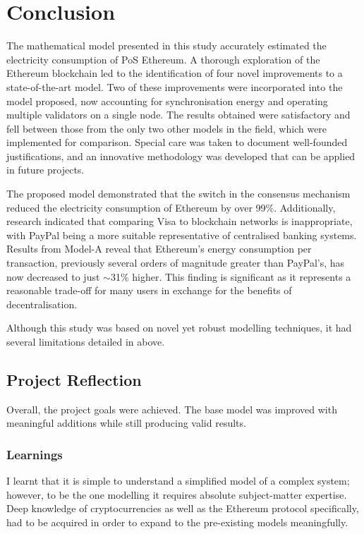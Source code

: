 \chapter{Conclusion}

The mathematical model presented in this study accurately estimated the electricity consumption of PoS Ethereum. A thorough exploration of the Ethereum blockchain led to the identification of four novel improvements to a state-of-the-art model. Two of these improvements were incorporated into the model proposed, now accounting for synchronisation energy and operating multiple validators on a single node. The results obtained were satisfactory and fell between those from the only two other models in the field, which were implemented for comparison. Special care was taken to document well-founded justifications, and an innovative methodology was developed that can be applied in future projects. 

The proposed model demonstrated that the switch in the consensus mechanism reduced the electricity consumption of Ethereum by over 99\%. Additionally, research indicated that comparing Visa to blockchain networks is inappropriate, with PayPal being a more suitable representative of centralised banking systems. Results from Model-A reveal that Ethereum's energy consumption per transaction, previously several orders of magnitude greater than PayPal's, has now decreased to just $\sim$31\% higher. This finding is significant as it represents a reasonable trade-off for many users in exchange for the benefits of decentralisation.  

Although this study was based on novel yet robust modelling techniques, it had several limitations detailed in  above.


\section{Project Reflection}

Overall, the project goals were achieved. The base model was improved with meaningful additions while still producing valid results.

\subsection{Learnings}

I learnt that it is simple to understand a simplified model of a complex system; however, to be the one modelling it requires absolute subject-matter expertise. Deep knowledge of cryptocurrencies as well as the Ethereum protocol specifically, had to be acquired in order to expand to the pre-existing models meaningfully. 

